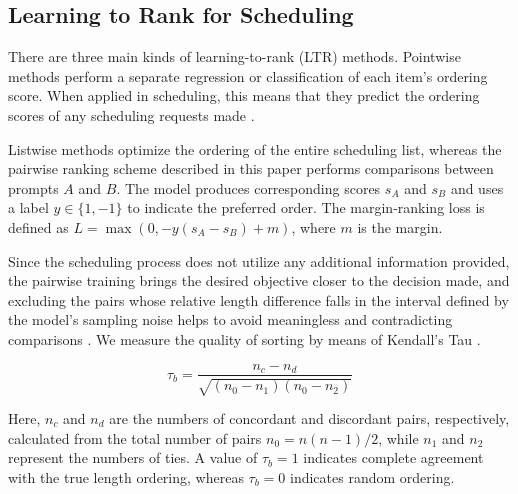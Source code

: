 \documentclass[conference]{IEEEtran}
\begin{document}
\subsection{Learning to Rank for Scheduling}
There are three main kinds of learning-to-rank (LTR) methods. Pointwise methods perform a separate regression or classification of each item's ordering score. When applied in scheduling, this means that they predict the ordering scores of any scheduling requests made \cite{jin2023s3,qiu2024ssjf}.

Listwise methods optimize the ordering of the entire scheduling list, whereas
the pairwise ranking scheme described in this paper performs comparisons
between prompts $A$ and $B$. The model produces corresponding scores $s_A$
and $s_B$ and uses a label $y \in \{1,-1\}$ to indicate the preferred order.
The margin-ranking loss is defined as
$L=\max(0,-y(s_A-s_B)+m)$, where $m$ is the margin.

Since the scheduling process does not utilize any additional information provided, the pairwise training brings the desired objective closer to the decision made, and excluding the pairs whose relative length difference falls in the interval defined by the model’s sampling noise helps to avoid meaningless and contradicting comparisons \cite{tao2025pars}. We measure the quality of sorting by means of Kendall’s Tau \cite{kendall1938}.

\begin{equation}
\tau_b=\frac{n_c-n_d}
{\sqrt{(n_0-n_1)(n_0-n_2)}}
\end{equation}

Here, $n_c$ and $n_d$ are the numbers of concordant and discordant pairs,
respectively, calculated from the total number of pairs
$n_0 = n(n-1)/2$, while $n_1$ and $n_2$ represent the numbers of ties.
A value of $\tau_b = 1$ indicates complete agreement with the true length
ordering, whereas $\tau_b = 0$ indicates random ordering.
\end{document}
